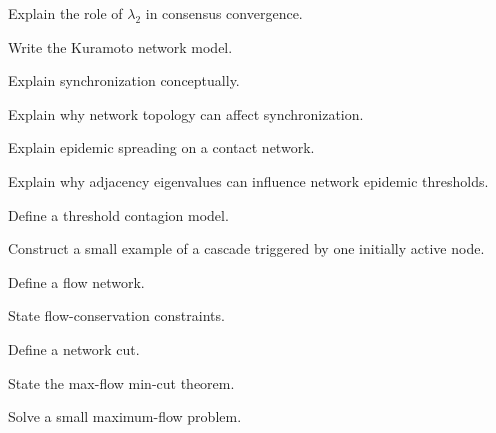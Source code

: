 \begin{exercise}[3]
Explain the role of \(\lambda_2\) in consensus convergence.
\end{exercise}

\begin{exercise}[2]
Write the Kuramoto network model.
\end{exercise}

\begin{exercise}[3]
Explain synchronization conceptually.
\end{exercise}

\begin{exercise}[3]
Explain why network topology can affect synchronization.
\end{exercise}

\begin{exercise}[2]
Explain epidemic spreading on a contact network.
\end{exercise}

\begin{exercise}[3]
Explain why adjacency eigenvalues can influence network epidemic thresholds.
\end{exercise}

\begin{exercise}[2]
Define a threshold contagion model.
\end{exercise}

\begin{exercise}[3]
Construct a small example of a cascade triggered by one initially active
node.
\end{exercise}

\begin{exercise}[2]
Define a flow network.
\end{exercise}

\begin{exercise}[2]
State flow-conservation constraints.
\end{exercise}

\begin{exercise}[2]
Define a network cut.
\end{exercise}

\begin{exercise}[2]
State the max-flow min-cut theorem.
\end{exercise}

\begin{exercise}[3]
Solve a small maximum-flow problem.
\end{exercise}

